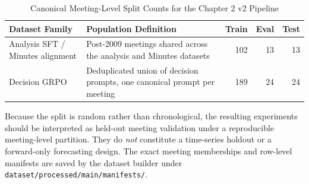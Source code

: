 \begin{table}[htbp]
\centering
\footnotesize
\begin{tabular}{l l r r r}
\toprule
\textbf{Dataset Family} & \textbf{Population Definition} & \textbf{Train} & \textbf{Eval} & \textbf{Test} \\
\midrule
Analysis SFT / Minutes alignment & Post-2009 meetings shared across the analysis and Minutes datasets & 102 & 13 & 13 \\
Decision GRPO & Deduplicated union of decision prompts, one canonical prompt per meeting & 189 & 24 & 24 \\
\bottomrule
\end{tabular}
\caption{Canonical Meeting-Level Split Counts for the Chapter 2 v2 Pipeline}
\label{tab:ch2:dataset_partition_stage1}
\end{table}

Because the split is random rather than chronological, the resulting experiments should be interpreted as held-out meeting validation under a reproducible meeting-level partition. They do \textit{not} constitute a time-series holdout or a forward-only forecasting design. The exact meeting memberships and row-level manifests are saved by the dataset builder under \texttt{dataset/processed/main/manifests/}.



















